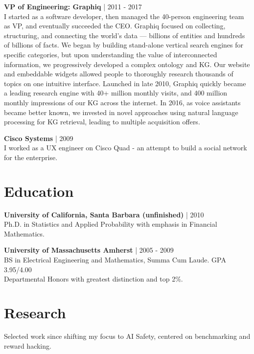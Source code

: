 \documentclass[a4paper,10pt]{article}
\begin{document}
\vspace{5pt} %

\noindent
\textbf{VP of Engineering: Graphiq} | 2011 - 2017 \\
I started as a software developer, then managed the 40-person engineering team as VP, and eventually succeeded the CEO. Graphiq focused on collecting, structuring, and connecting the world's data --- billions of entities and hundreds of billions of facts. We began by building stand-alone vertical search engines for specific categories, but upon understanding the value of interconnected information, we progressively developed a complex ontology and KG. Our website and embeddable widgets allowed people to thoroughly research thousands of topics on one intuitive interface. Launched in late 2010, Graphiq quickly became a leading research engine with 40+ million monthly visits, and 400 million monthly impressions of our KG across the internet. In 2016, as voice assistants became better known, we invested in novel approaches using natural language processing for KG retrieval, leading to multiple acquisition offers.

\vspace{5pt} %

\noindent
\textbf{Cisco Systems} | 2009 \\
I worked as a UX engineer on Cisco Quad - an attempt to build a social network for the enterprise.

\section*{Education}

\noindent
\textbf{University of California, Santa Barbara (unfinished)} | 2010 \\
Ph.D. in Statistics and Applied Probability with emphasis in Financial Mathematics.

\vspace{5pt} %

\noindent
\textbf{University of Massachusetts Amherst} | 2005 - 2009 \\
BS in Electrical Engineering and Mathematics, Summa Cum Laude. GPA 3.95/4.00 \\
Departmental Honors with greatest distinction and top 2\%.

\section*{Research}
\noindent
Selected work since shifting my focus to AI Safety, centered on benchmarking and reward hacking.
\end{document}
